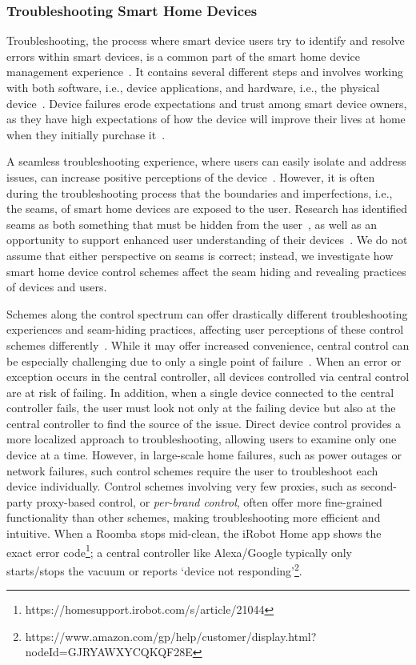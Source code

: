 \subsubsection{Troubleshooting Smart Home Devices}
Troubleshooting, the process where smart device users try to identify and resolve errors within smart devices, is a common part of the smart home device management experience~\cite{teigen2024troubleshooting}. It contains several different steps and involves working with both software, i.e., device applications, and hardware, i.e., the physical device~\cite{smart-troubleshooting}.
Device failures erode expectations and trust among smart device owners, as they have high expectations of how the device will improve their lives at home when they initially purchase it~\cite {abdallah2017lessons, teigen2024troubleshooting}.

A seamless troubleshooting experience, where users can easily isolate and address issues, can increase positive perceptions of the device~\cite{he2019smart}. {However, it is often during the troubleshooting process that the boundaries and imperfections, i.e., the seams, of smart home devices are exposed to the user. Research has identified seams as both something that must be hidden from the user~\cite{ansari2025seamless, kim2012seamless}, as well as an opportunity to support enhanced user understanding of their devices~\cite{garg2022social, lu2008hide, lu2009human}. We do not assume that either perspective on seams is correct; instead, we investigate how smart home device control schemes affect the seam hiding and revealing practices of devices and users.}

Schemes along the control spectrum can offer drastically different troubleshooting experiences and seam-hiding practices, affecting user perceptions of these control schemes differently~\cite{balta2013social}. While it may offer increased convenience, central control can be especially challenging due to only a single point of failure~\cite{malik2023iot}. When an error or exception occurs in the central controller, all devices controlled via central control are at risk of failing. In addition, when a single device connected to the central controller fails, the user must look not only at the failing device but also at the central controller to find the source of the issue. Direct device control provides a more localized approach to troubleshooting, allowing users to examine only one device at a time. However, in large-scale home failures, such as power outages or network failures, such control schemes require the user to troubleshoot each device individually. Control schemes {involving very few proxies, such as second-party proxy-based control, or \textit{per-brand control}}, often offer more fine-grained functionality than other schemes, making troubleshooting more efficient and intuitive. When a Roomba stops mid-clean, the iRobot Home app shows the exact error code\footnote{https://homesupport.irobot.com/s/article/21044}; a central controller like Alexa/Google typically only starts/stops the vacuum or reports `device not responding'\footnote{https://www.amazon.com/gp/help/customer/display.html?nodeId=GJRYAWXYCQKQF28E}.

